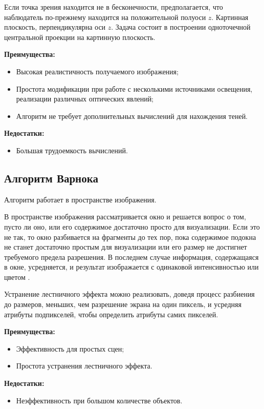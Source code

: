 Если точка зрения находится не в бесконечности, предполагается, что наблюдатель по-прежнему находится на положительной полуоси $z$. Картинная плоскость, перпендикулярна оси $z$. Задача состоит в построении одноточечной центральной проекции на картинную плоскость. 

\textbf{Преимущества:}
\begin{itemize}[label=---]
	\item Высокая реалистичность получаемого изображения;
	\item Простота модификации при работе с несколькими источниками освещения, реализации различных оптических явлений;
	\item Алгоритм не требует дополнительных вычислений для нахождения теней.
\end{itemize}

\textbf{Недостатки:}
\begin{itemize}[label=---]
	\item Большая трудоемкость вычислений.
\end{itemize}

\subsection{Алгоритм Варнока}

Алгоритм работает в пространстве изображения.

В пространстве изображения рассматривается окно и решается вопрос о том, пусто ли оно, или его содержимое достаточно просто для визуализации. Если это не так, то окно разбивается на фрагменты до тех пор, пока содержимое подокна не станет достаточно простым для визуализации или его размер не достигнет требуемого предела разрешения. В последнем случае информация, содержащаяся в окне, усредняется, и результат изображается с одинаковой интенсивностью или цветом \cite{lectures}. 

Устранение лестничного эффекта можно реализовать, доведя процесс разбиения до размеров, меньших, чем разрешение экрана на один пиксель, и усредняя атрибуты подпикселей, чтобы определить атрибуты самих пикселей.

\textbf{Преимущества:}
\begin{itemize}[label=---]
	\item Эффективность для простых сцен;
	\item Простота устранения лестничного эффекта.
\end{itemize}

\textbf{Недостатки:}
\begin{itemize}[label=---]
	\item Неэффективность при большом количестве объектов.
\end{itemize}

